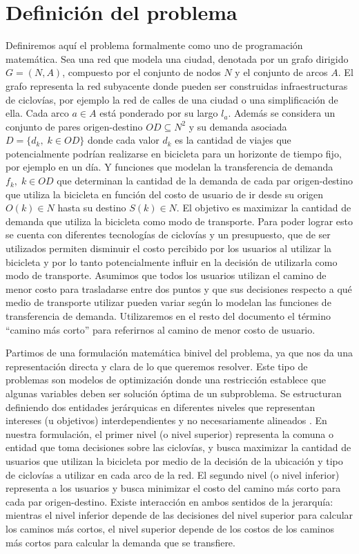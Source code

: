 \chapter{Definición del problema}
\label{sect:problemdefinition}

Definiremos aquí el problema formalmente como uno de programación matemática. Sea una red que modela una ciudad, denotada por un grafo dirigido $G=(N,A)$, compuesto por el conjunto de nodos $N$ y el conjunto de arcos $A$. El grafo representa la red subyacente donde pueden ser construidas infraestructuras de ciclovías, por ejemplo la red de calles de una ciudad o una simplificación de ella. Cada arco $a \in A$ está ponderado por su largo $l_a$. Además se considera un conjunto de pares origen-destino $OD \subseteq N^2$ y su demanda asociada $D = \{d_k,\; k \in OD\}$ donde cada valor $d_k$ es la cantidad de viajes que potencialmente podrían realizarse en bicicleta para un horizonte de tiempo fijo, por ejemplo en un día. Y funciones que modelan la transferencia de demanda $f_k,\;k \in OD$ que determinan la cantidad de la demanda de cada par origen-destino que utiliza la bicicleta en función del costo de usuario de ir desde su origen $O(k) \in N$ hasta su destino $S(k) \in N$. El objetivo es maximizar la cantidad de demanda que utiliza la bicicleta como modo de transporte. Para poder lograr esto se cuenta con diferentes tecnologías de ciclovías y un presupuesto, que de ser utilizados permiten disminuir el costo percibido por los usuarios al utilizar la bicicleta y por lo tanto potencialmente influir en la decisión de utilizarla como modo de transporte. Asumimos que todos los usuarios utilizan el camino de menor costo para trasladarse entre dos puntos y que sus decisiones respecto a qué medio de transporte utilizar pueden variar según lo modelan las funciones de transferencia de demanda. Utilizaremos en el resto del documento el término ``camino más corto'' para referirnos al camino de menor costo de usuario.

Partimos de una formulación matemática binivel del problema, ya que nos da una representación directa y clara de lo que queremos resolver. Este tipo de problemas son modelos de optimización donde una restricción establece que algunas variables deben ser solución óptima de un subproblema. Se estructuran definiendo dos entidades jerárquicas en diferentes niveles que representan intereses (u objetivos) interdependientes y no necesariamente alineados \parencite{bardbook}. En nuestra formulación, el primer nivel (o nivel superior) representa la comuna o entidad que toma decisiones sobre las ciclovías, y busca maximizar la cantidad de usuarios que utilizan la bicicleta por medio de la decisión de la ubicación y tipo de ciclovías a utilizar en cada arco de la red. El segundo nivel (o nivel inferior) representa a los usuarios y busca minimizar el costo del camino más corto para cada par origen-destino. Existe interacción en ambos sentidos de la jerarquía: mientras el nivel inferior depende de las decisiones del nivel superior para calcular los caminos más cortos, el nivel superior depende de los costos de los caminos más cortos para calcular la demanda que se transfiere.

